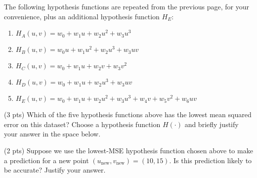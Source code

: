 \documentclass[twoside,12pt]{article}
\begin{document}
\begin{probset}
\begin{prob}
\begin{subprobset}
\begin{subprob}
        \begin{center}
        \end{center}
    \end{subprob}
\end{subprobset}
The following hypothesis functions are repeated from the previous page, for your convenience, plus an additional hypothesis function $H_E$:
\begin{enumerate}
    \item $H_A(u, v) = w_0 + w_1 u + w_2 u^2 + w_3 u^3$
    
    
    \item $H_B(u, v) = w_0 u + w_1 u^2 + w_2 u^3 + w_3 u v$

    \item $H_C(u, v) = w_0 + w_1 u + w_2 v + w_3 v^2$
    
    \item $H_D(u, v) = w_0 + w_1 u + w_2 u^3 + w_3 u v$
    
    \item $H_E(u, v) = w_0 + w_1 u + w_2 u^2 + w_3 u^3 + w_4 v + w_5 v^2 + w_6 u v$
\end{enumerate}
\begin{subprobset}
    \begin{subprob}(3 pts)
        Which of the five hypothesis functions above has the lowest mean squared error on this dataset? Choose a hypothesis function $H(\cdot)$ and briefly justify your answer in the space below.

        \begin{center}
        \end{center}

        \begin{responsebox}{1in}
            
        \end{responsebox}
    \end{subprob}

    \begin{subprob}(2 pts)
        Suppose we use the lowest-MSE hypothesis function chosen above to make a prediction for a new point $(u_\text{new}, v_\text{new}) = (10, 15)$. Is this prediction likely to be accurate? Justify your answer.


\end{subprob}
\end{subprobset}
\end{prob}
\end{probset}
\end{document}
